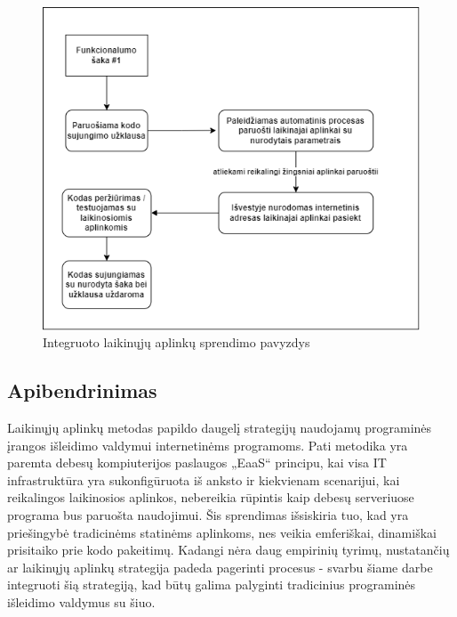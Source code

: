 \documentclass{VUMIFPSkursinis}
\begin{document}
\begin{figure}[H]
    \centering
    \includegraphics[scale=0.6]{img/PvzBuduv2.png}
    \caption{Integruoto laikinųjų aplinkų sprendimo pavyzdys}
    \label{img:mlp}
\end{figure}

\subsection{Apibendrinimas}

Laikinųjų aplinkų metodas papildo daugelį strategijų naudojamų programinės įrangos išleidimo valdymui internetinėms programoms. Pati metodika yra paremta debesų kompiuterijos paslaugos „EaaS“ principu, kai visa IT infrastruktūra yra sukonfigūruota iš anksto ir kiekvienam scenarijui, kai reikalingos laikinosios aplinkos, nebereikia rūpintis kaip debesų serveriuose programa bus paruošta naudojimui. Šis sprendimas išsiskiria tuo, kad yra priešingybė tradicinėms statinėms aplinkoms, nes veikia emferiškai, dinamiškai prisitaiko prie kodo pakeitimų. Kadangi nėra daug empirinių tyrimų, nustatančių ar laikinųjų aplinkų strategija padeda pagerinti procesus - svarbu šiame darbe integruoti šią strategiją, kad būtų galima palyginti tradicinius programinės išleidimo valdymus su šiuo.

\end{document}

